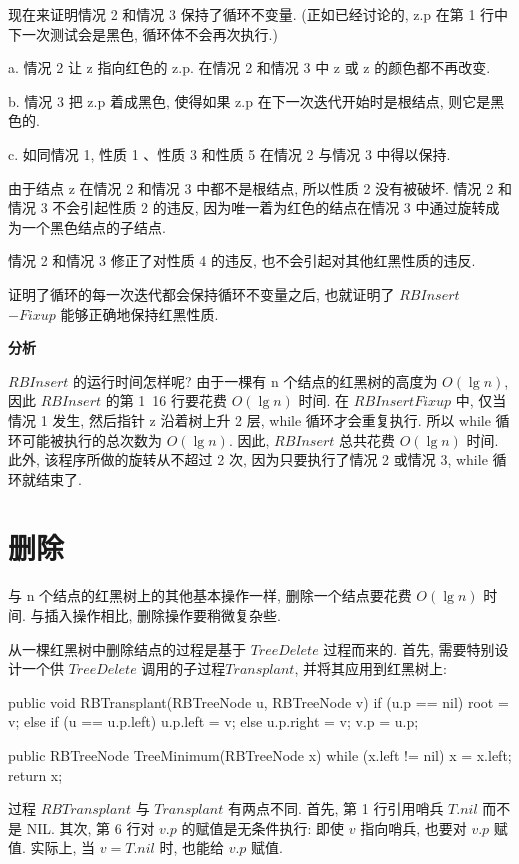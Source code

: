 \documentclass[oneside,10pt,fontset=none]{ctexbook}
\numberwithin{definition}{chapter}
\numberwithin{theorem}{chapter}
\numberwithin{lemma}{chapter}
\begin{document}
现在来证明情况 2 和情况 3 保持了循环不变量. (正如已经讨论的, z.p 在第 1 行中下一次测试会是黑色, 循环体不会再次执行.)

a. 情况 2 让 z 指向红色的 z.p. 在情况 2 和情况 3 中 z 或 z 的颜色都不再改变.

b. 情况 3 把 z.p 着成黑色, 使得如果 z.p 在下一次迭代开始时是根结点, 则它是黑色的.

c. 如同情况 1, 性质 1 、性质 3 和性质 5 在情况 2 与情况 3 中得以保持.

由于结点 z 在情况 2 和情况 3 中都不是根结点, 所以性质 2 没有被破坏. 情况 2 和情况 3 不会引起性质 2 的违反, 因为唯一着为红色的结点在情况 3 中通过旋转成为一个黑色结点的子结点.

情况 2 和情况 3 修正了对性质 4 的违反, 也不会引起对其他红黑性质的违反.

证明了循环的每一次迭代都会保持循环不变量之后, 也就证明了 $RBInsert$ $-Fixup$ 能够正确地保持红黑性质.

\textbf{分析}

$RBInsert$ 的运行时间怎样呢? 由于一棵有 n 个结点的红黑树的高度为 $O(\lg{n})$, 因此 $RBInsert$ 的第 1~16 行要花费 $O(\lg{n})$ 时间. 在 $RBInsertFixup$ 中, 仅当情况 1 发生, 然后指针 z 沿着树上升 2 层, while 循环才会重复执行. 所以 while 循环可能被执行的总次数为 $O(\lg{n})$. 因此, $RBInsert$ 总共花费 $O(\lg n)$ 时间. 此外, 该程序所做的旋转从不超过 2 次, 因为只要执行了情况 2 或情况 3, while 循环就结束了.

\section{删除}\label{section:红黑树的删除}

与 n 个结点的红黑树上的其他基本操作一样, 删除一个结点要花费 $O(\lg n)$ 时间. 与插入操作相比, 删除操作要稍微复杂些.

从一棵红黑树中删除结点的过程是基于 $TreeDelete$ 过程而来的. 首先, 需要特别设计一个供 $TreeDelete$ 调用的子过程$Transplant$, 并将其应用到红黑树上:

\begin{myjava}{}{}{}
public void RBTransplant(RBTreeNode u, RBTreeNode v) {
    if (u.p == nil)
        root = v;
    else if (u == u.p.left)
        u.p.left = v;
    else
        u.p.right = v;
    v.p = u.p;
}

public RBTreeNode TreeMinimum(RBTreeNode x) {
    while (x.left != nil) {
        x = x.left;
    }
    return x;
}
\end{myjava}

过程 $RBTransplant$ 与 $Transplant$ 有两点不同. 首先, 第 1 行引用哨兵 $T.nil$ 而不是 NIL. 其次, 第 6 行对 $v.p$ 的赋值是无条件执行: 即使 $v$ 指向哨兵, 也要对 $v.p$ 赋值. 实际上, 当 $v=T.nil$ 时, 也能给 $v.p$ 赋值.
\end{document}

